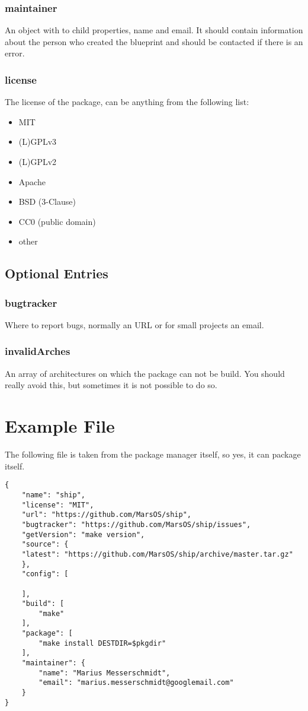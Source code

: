 \documentclass[]{article}
\begin{document}
\begin{multicols}{2}
		\subsubsection{maintainer}
		An object with to child properties, name and email. It should contain information about the person who created the blueprint and should be contacted if there is an error.
		\subsubsection{license}
		The license of the package, can be anything from the following list:
		\begin{itemize}
			\item MIT
			\item (L)GPLv3
			\item (L)GPLv2
			\item Apache
			\item BSD (3-Clause)
			\item CC0 (public domain)
			\item other
		\end{itemize}

	\subsection{Optional Entries}
		\subsubsection{bugtracker}
		Where to report bugs, normally an URL or for small projects an email.
		\subsubsection{invalidArches}
		An array of architectures on which the package can not be build. You should really avoid this, but sometimes it is not possible to do so.

	\pagebreak

\end{multicols}

\section{Example File}
The following file is taken from the package manager itself, so yes, it can package itself.
\begin{lstlisting}
{
	"name": "ship",
	"license": "MIT",
	"url": "https://github.com/MarsOS/ship",
	"bugtracker": "https://github.com/MarsOS/ship/issues",
	"getVersion": "make version",
	"source": {
	"latest": "https://github.com/MarsOS/ship/archive/master.tar.gz"
	},
	"config": [

	],
	"build": [
		"make"
	],
	"package": [
		"make install DESTDIR=$pkgdir"
	],
	"maintainer": {
		"name": "Marius Messerschmidt",
		"email": "marius.messerschmidt@googlemail.com"
	}
}
\end{lstlisting}
\end{document}

